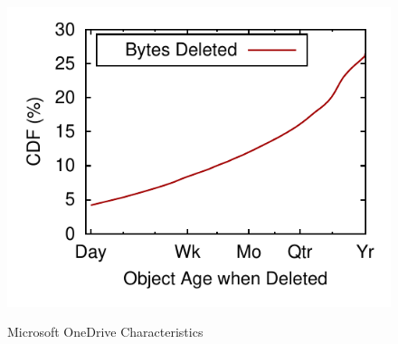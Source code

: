 \begin{figure}[!htbp]
\begin{minipage}{0.7\textwidth}
		\hspace{-1.5em}
    \subcaptionbox{\label{fig:deletion}}
      {\includegraphics[height=0.275\textwidth]{data/age-bytes}}%
\caption{Microsoft OneDrive Characteristics}
\label{fig:case_for_giza}
\end{minipage}%

\end{figure}
